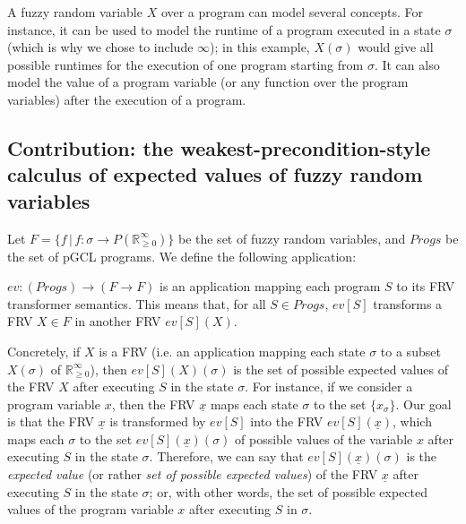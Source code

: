 \documentclass[a4paper,10pt]{llncs}
\def\RRposi {{\mathbb R_{\geq 0}^{\infty}}}
\begin{document}
A fuzzy random variable $X$ over a program can model several concepts. For instance, it can be used to model the runtime of a program executed in a state $\sigma$ (which is why we chose to include $\infty$); in this example, $X(\sigma)$ would give all possible runtimes for the execution of one program starting from $\sigma$. It can also model the value of a program variable (or any function over the program variables) after the execution of a program.\newline

\subsection{Contribution: the weakest-precondition-style calculus of expected values of fuzzy random variables}
Let $F = \{f \,|\, f : \sigma \rightarrow P(\RRposi) \}$ be the set of fuzzy random variables, and $Progs$ be the set of pGCL programs. We define the following application:

\begin{definition}
 $ev : (Progs) \rightarrow (F \rightarrow F)$ is an application mapping each program $S$ to its FRV transformer semantics. This means that, for all $S \in Progs$, $ev[S]$ transforms a FRV $X \in F$ in another FRV $ev[S](X)$.
\end{definition}
Concretely, if $X$ is a FRV (i.e. an application mapping each state $\sigma$ to a subset $X(\sigma)$ of $\RRposi$), then $ev[S](X)(\sigma)$ is the set of possible expected values of the FRV $X$ after executing $S$ in the state $\sigma$.\newline
For instance, if we consider a program variable $x$, then the FRV $\underline{x}$ maps each state $\sigma$ to the set $\{x_\sigma\}$. Our goal is that the FRV $\underline{x}$ is transformed by $ev[S]$ into the FRV $ev[S](\underline{x})$, which maps each $\sigma$ to the set $ev[S](\underline{x})(\sigma)$ of possible values of the variable $x$ after executing $S$ in the state $\sigma$. Therefore, we can say that $ev[S](\underline{x})(\sigma)$ is the \emph{expected value} (or rather \emph{set of possible expected values}) of the FRV $\underline{x}$ after executing $S$ in the state $\sigma$; or, with other words, the set of possible expected values of the program variable $x$ after executing $S$ in $\sigma$.\newline
\end{document}
